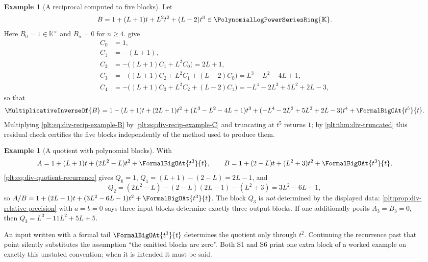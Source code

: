 \documentclass[11pt,oneside]{article}
\theoremstyle{plain}
\theoremstyle{definition}
\newtheorem{example}[theorem]{Example}
\theoremstyle{remark}
\newcommand{\K}{\mathbb{K}}
\newcommand{\PLpow}{\PolynomialLogPowerSeriesRing{\K}}   %
\newcommand{\recip}[1]{\MultiplicativeInverseOf{#1}}
\begin{document}
\begin{example}[A reciprocal computed to five blocks]
\label{plt:ex:div-reciprocal-worked}
Let
\begin{equation}\label{plt:eq:div-recip-example-B}
  B=1+(L+1)t+L^{2}t^{2}+(L-2)t^{3}\in\PLpow .
\end{equation}
Here \(B_{0}=1\in\K^{\times}\) and \(B_{n}=0\) for \(n\ge4\).
 give
\begin{align*}
  C_{0}&=1,\\
  C_{1}&=-(L+1),\\
  C_{2}&=-\bigl((L+1)C_{1}+L^{2}C_{0}\bigr)=2L+1,\\
  C_{3}&=-\bigl((L+1)C_{2}+L^{2}C_{1}+(L-2)C_{0}\bigr)
        =L^{3}-L^{2}-4L+1,\\
  C_{4}&=-\bigl((L+1)C_{3}+L^{2}C_{2}+(L-2)C_{1}\bigr)
        =-L^{4}-2L^{3}+5L^{2}+2L-3,
\end{align*}
so that
\begin{equation}\label{plt:eq:div-recip-example-C}
  \recip{B}=1-(L+1)t+(2L+1)t^{2}+(L^{3}-L^{2}-4L+1)t^{3}
  +(-L^{4}-2L^{3}+5L^{2}+2L-3)t^{4}+\FormalBigOAt{t^{5}}{t}.
\end{equation}
Multiplying \cref{plt:eq:div-recip-example-B} by
\cref{plt:eq:div-recip-example-C} and truncating at \(t^{5}\) returns \(1\);
by \cref{plt:thm:div-truncated} this residual check certifies the five blocks
independently of the method used to produce them.
\end{example}

\begin{example}[A quotient with polynomial blocks]
\label{plt:ex:div-quotient-worked}
With
\[
  A=1+(L+1)t+(2L^{2}-L)t^{2}+\FormalBigOAt{t^{3}}{t},
  \qquad
  B=1+(2-L)t+(L^{2}+3)t^{2}+\FormalBigOAt{t^{3}}{t},
\]
\cref{plt:eq:div-quotient-recurrence} gives
\(Q_{0}=1\), \(Q_{1}=(L+1)-(2-L)=2L-1\), and
\[
  Q_{2}=(2L^{2}-L)-(2-L)(2L-1)-(L^{2}+3)=3L^{2}-6L-1,
\]
so \(A/B=1+(2L-1)t+(3L^{2}-6L-1)t^{2}+\FormalBigOAt{t^{3}}{t}\).  The block
\(Q_{3}\) is \emph{not} determined by the displayed data:
\cref{plt:prop:div-relative-precision} with \(a=b=0\) says three input blocks
determine exactly three output blocks.  If one additionally posits
\(A_{3}=B_{3}=0\), then \(Q_{3}=L^{3}-11L^{2}+5L+5\).
\end{example}

\begin{warningbox}[title={Do not read a block that the data does not contain}]
An input written with a formal tail \(\FormalBigOAt{t^{3}}{t}\) determines the
quotient only through \(t^{2}\).  Continuing the recurrence past that point
silently substitutes the assumption ``the omitted blocks are zero''.  Both S1
and S6 print one extra block of a worked example on exactly this unstated
convention; when it is intended it must be said.
\end{warningbox}
\end{document}
